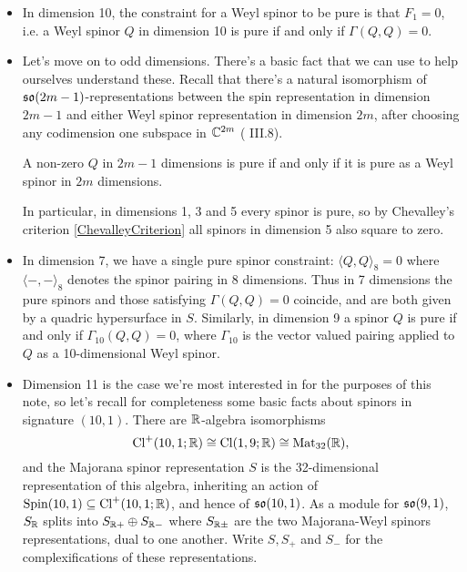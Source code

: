 \documentclass[10pt, oneside]{article}
\begin{document}
\begin{itemize}
 \item In dimension 10, the constraint for a Weyl spinor to be pure is that $F_1 = 0$, i.e. a Weyl spinor $Q$ in dimension 10 is pure if and only if $\Gamma(Q,Q) = 0$.
 
 \item Let's move on to odd dimensions.  There's a basic fact that we can use to help ourselves understand these.  Recall that there's a natural isomorphism of $\mathfrak{so}(2m-1)$-representations between the spin representation in dimension $2m-1$ and either Weyl spinor representation in dimension $2m$, after choosing any codimension one subspace in $\mathbb{C}^{2m}$ (\cite{Chevalley} III.8).
 \begin{prop}
 A non-zero $Q$ in $2m-1$ dimensions is pure if and only if it is pure as a Weyl spinor in $2m$ dimensions.
 \end{prop}
 In particular, in dimensions 1, 3 and 5 every spinor is pure, so by Chevalley's criterion \ref{ChevalleyCriterion} all spinors in dimension 5 also square to zero.
 
 \item In dimension 7, we have a single pure spinor constraint: $\langle Q, Q \rangle_8 = 0$ where $\langle-,-\rangle_8$ denotes the spinor pairing in 8 dimensions.  Thus in 7 dimensions the pure spinors and those satisfying $\Gamma(Q,Q) = 0$ coincide, and are both given by a quadric hypersurface in $S$.  Similarly, in dimension 9 a spinor $Q$ is pure if and only if $\Gamma_{10}(Q,Q) = 0$, where $\Gamma_{10}$ is the vector valued pairing applied to $Q$ as a 10-dimensional Weyl spinor.  
 
 \item Dimension 11 is the case we're most interested in for the purposes of this note, so let's recall for completeness some basic facts about spinors in signature $(10,1)$.  There are $\mathbb{R}$-algebra isomorphisms
\[\mathrm{Cl}^+(10,1;\mathbb{R}) \cong \mathrm{Cl}(1,9; \mathbb{R}) \cong \operatorname{Mat}_{32}(\mathbb{R}),\]
and the Majorana spinor representation $S$ is the 32-dimensional representation of this algebra, inheriting an action of $\mathrm{Spin}(10,1) \subseteq \mathrm{Cl}^+(10,1;\mathbb{R})$, and hence of $\mathfrak{so}(10,1)$.  As a module for $\mathfrak{so}(9,1)$, $S_{\mathbb{R}}$ splits into $S_{\mathbb{R}+} \oplus S_{\mathbb{R}-}$ where $S_{\mathbb{R}\pm}$ are the two Majorana-Weyl spinors representations, dual to one another.  Write $S, S_+$ and $S_-$ for the complexifications of these representations.


\end{itemize}
\end{document}
